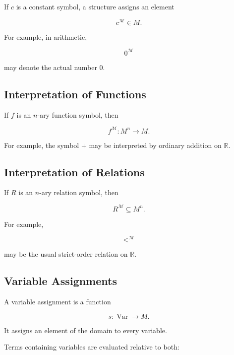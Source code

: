If \(c\) is a constant symbol, a structure assigns an element

\[
\boxed{
c^{\mathcal{M}}
\in M.
}
\]

For example, in arithmetic,

\[
0^{\mathcal{M}}
\]

may denote the actual number \(0\).

\subsection{Interpretation of Functions}
\label{subsec:interpretation-functions}

If \(f\) is an \(n\)-ary function symbol, then

\[
\boxed{
f^{\mathcal{M}}
:
M^n
\rightarrow
M.
}
\]

For example, the symbol \(+\) may be interpreted by ordinary addition on
\(\mathbb{R}\).

\subsection{Interpretation of Relations}
\label{subsec:interpretation-relations}

If \(R\) is an \(n\)-ary relation symbol, then

\[
\boxed{
R^{\mathcal{M}}
\subseteq
M^n.
}
\]

For example,

\[
<^{\mathcal{M}}
\]

may be the usual strict-order relation on \(\mathbb{R}\).

\subsection{Variable Assignments}
\label{subsec:first-order-variable-assignments}

A variable assignment is a function

\[
\boxed{
s:
\operatorname{Var}
\rightarrow
M.
}
\]

It assigns an element of the domain to every variable.

Terms containing variables are evaluated relative to both:

